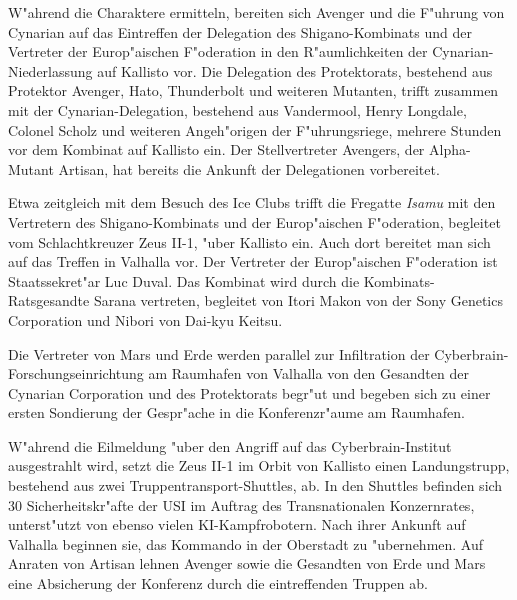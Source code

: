 
W"ahrend die Charaktere ermitteln, bereiten sich Avenger und die F"uhrung von Cynarian auf das Eintreffen der Delegation des Shigano-Kombinats und der Vertreter der Europ"aischen F"oderation in den R"aumlichkeiten der Cynarian-Niederlassung auf Kallisto vor. Die Delegation des Protektorats, bestehend aus Protektor Avenger, Hato, Thunderbolt und weiteren Mutanten, trifft zusammen mit der Cynarian-Delegation, bestehend aus Vandermool, Henry Longdale, Colonel Scholz und weiteren Angeh"origen der F"uhrungsriege, mehrere Stunden vor dem Kombinat auf Kallisto ein. Der Stellvertreter Avengers, der Alpha-Mutant Artisan, hat bereits die Ankunft der Delegationen vorbereitet.

Etwa zeitgleich mit dem Besuch des Ice Clubs trifft die Fregatte \emph{Isamu} mit den Vertretern des Shigano-Kombinats und der Europ"aischen F"oderation, begleitet vom Schlachtkreuzer Zeus II-1, "uber Kallisto ein. Auch dort bereitet man sich auf das Treffen in Valhalla vor. Der Vertreter der Europ"aischen F"oderation ist Staatssekret"ar Luc Duval. Das Kombinat wird durch die Kombinats-Ratsgesandte Sarana vertreten, begleitet von Itori Makon von der Sony Genetics Corporation und Nibori von Dai-kyu Keitsu.

Die Vertreter von Mars und Erde werden parallel zur Infiltration der Cyberbrain-Forschungseinrichtung am Raumhafen von Valhalla von den Gesandten der Cynarian Corporation und des Protektorats begr"u\3t und begeben sich zu einer ersten Sondierung der Gespr"ache in die Konferenzr"aume am Raumhafen.



W"ahrend die Eilmeldung "uber den Angriff auf das Cyberbrain-Institut ausgestrahlt wird, setzt die Zeus II-1 im Orbit von Kallisto einen Landungstrupp, bestehend aus zwei Truppentransport-Shuttles, ab. In den Shuttles befinden sich 30 Sicherheitskr"afte der USI im Auftrag des Transnationalen Konzernrates, unterst"utzt von ebenso vielen KI-Kampfrobotern. Nach ihrer Ankunft auf Valhalla beginnen sie, das Kommando in der Oberstadt zu "ubernehmen. Auf Anraten von Artisan lehnen Avenger sowie die Gesandten von Erde und Mars eine Absicherung der Konferenz durch die eintreffenden Truppen ab.

